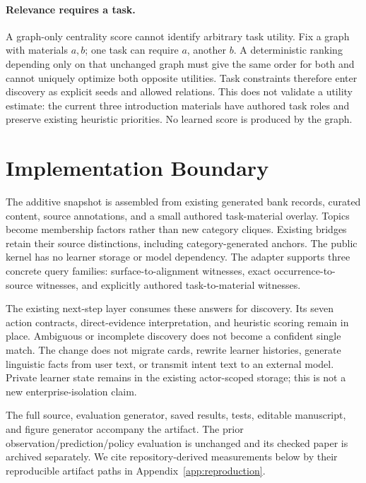 \documentclass{article}
\begin{document}
\paragraph{Relevance requires a task.}
A graph-only centrality score cannot identify arbitrary task utility. Fix a graph with materials $a,b$; one task can require $a$, another $b$. A deterministic ranking depending only on that unchanged graph must give the same order for both and cannot uniquely optimize both opposite utilities. Task constraints therefore enter discovery as explicit seeds and allowed relations. This does not validate a utility estimate: the current three introduction materials have authored task roles and preserve existing heuristic priorities. No learned score is produced by the graph.

\section{Implementation Boundary}
\label{sec:implementation}

The additive snapshot is assembled from existing generated bank records, curated content, source annotations, and a small authored task-material overlay. Topics become membership factors rather than new category cliques. Existing bridges retain their source distinctions, including category-generated anchors. The public kernel has no learner storage or model dependency. The adapter supports three concrete query families: surface-to-alignment witnesses, exact occurrence-to-source witnesses, and explicitly authored task-to-material witnesses.

The existing next-step layer consumes these answers for discovery. Its seven action contracts, direct-evidence interpretation, and heuristic scoring remain in place. Ambiguous or incomplete discovery does not become a confident single match. The change does not migrate cards, rewrite learner histories, generate linguistic facts from user text, or transmit intent text to an external model. Private learner state remains in the existing actor-scoped storage; this is not a new enterprise-isolation claim.

The full source, evaluation generator, saved results, tests, editable manuscript, and figure generator accompany the artifact. The prior observation/prediction/policy evaluation is unchanged and its checked paper is archived separately. We cite repository-derived measurements below by their reproducible artifact paths in Appendix~\ref{app:reproduction}.
\end{document}
